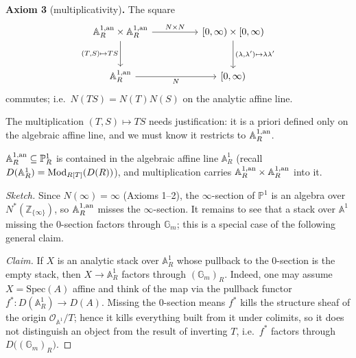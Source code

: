 \textbf{Axiom 3} (multiplicativity)\textbf{.} The square
\begin{equation*}
\begin{tikzcd}[column sep=huge, row sep=large]
\Aan_R\times\Aan_R \arrow[r, "N\times N"]
\arrow[d, "{(T,S)\mapsto TS}"'] & {[0,\infty)\times[0,\infty)}
\arrow[d, "{(\lambda,\lambda')\mapsto\lambda\lambda'}"] \\
\Aan_R \arrow[r, "N"'] & {[0,\infty)}
\end{tikzcd}
\end{equation*}
commutes; i.e.\ $N(TS)=N(T)N(S)$ on the analytic affine line.

The multiplication $(T,S)\mapsto TS$ needs justification: it is a priori defined
only on the algebraic affine line, and we must know it restricts to $\mathbb{A}^{1,\mathrm{an}}_R$.

\begin{lemma}
\label{lem:20:mult-well-defined}
$\mathbb{A}^{1,\mathrm{an}}_R\subseteq\mathbb P^1_R$ is contained in the algebraic affine line
$\mathbb A^1_R$ (recall $D(\mathbb A^1_R)=\operatorname{Mod}_{R[T]}(D(R))$), and multiplication
carries $\mathbb{A}^{1,\mathrm{an}}_R\times\mathbb{A}^{1,\mathrm{an}}_R$ into it.
\end{lemma}

\begin{proof}[Sketch]
Since $N(\infty)=\infty$ (Axioms 1--2), the $\infty$-section of $\mathbb P^1$ is
an algebra over $N^*(\mathbb Z_{\{\infty\}})$, so $\mathbb{A}^{1,\mathrm{an}}_R$ misses the
$\infty$-section. It remains to see that a stack over $\mathbb A^1$ missing the
$0$-section factors through $\mathbb G_m$; this is a special case of the
following general claim.

\emph{Claim.} If $X$ is an analytic stack over $\mathbb A^1_R$ whose pullback to
the $0$-section is the empty stack, then $X\to\mathbb A^1_R$ factors through
$(\mathbb G_m)_R$. Indeed, one may assume $X=\mathrm{Spec}(A)$ affine and think of
the map via the pullback functor $f^*\colon D(\mathbb A^1_R)\to D(A)$. Missing
the $0$-section means $f^*$ kills the structure sheaf of the origin
$\mathcal O_{\mathbb A^1}/T$; hence it kills everything built from it under
colimits, so it does not distinguish an object from the result of inverting $T$,
i.e.\ $f^*$ factors through $D\bigl((\mathbb G_m)_R\bigr)$. \qedhere
\end{proof}

